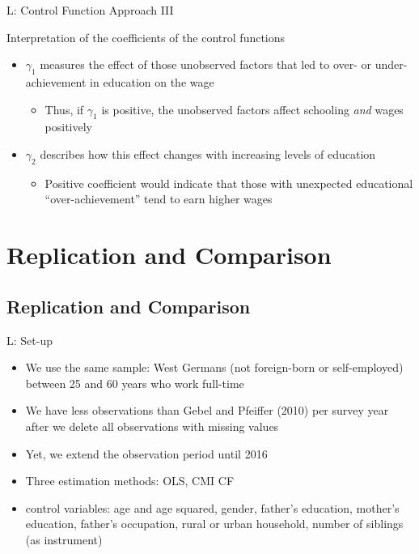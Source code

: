 \documentclass[10pt,ignorenonframetext,]{beamer}
\providecommand{\tightlist}{%
  \setlength{\itemsep}{0pt}\setlength{\parskip}{0pt}}
\begin{document}
\begin{frame}{L: Control Function Approach III}
\protect\hypertarget{l-control-function-approach-iii}{}

Interpretation of the coefficients of the control functions

\begin{itemize}
\tightlist
\item
  \(\gamma_1\) measures the effect of those unobserved factors that led
  to over- or under-achievement in education on the wage

  \begin{itemize}
  \tightlist
  \item
    Thus, if \(\gamma_1\) is positive, the unobserved factors affect
    schooling \emph{and} wages positively
  \end{itemize}
\item
  \(\gamma_2\) describes how this effect changes with increasing levels
  of education

  \begin{itemize}
  \tightlist
  \item
    Positive coefficient would indicate that those with unexpected
    educational ``over-achievement'' tend to earn higher wages
  \end{itemize}
\end{itemize}

\end{frame}

\hypertarget{replication-and-comparison}{%
\section{Replication and Comparison}\label{replication-and-comparison}}

\hypertarget{replication-and-comparison-1}{%
\subsection{Replication and
Comparison}\label{replication-and-comparison-1}}

\begin{frame}{L: Set-up}
\protect\hypertarget{l-set-up}{}

\begin{itemize}
\tightlist
\item
  We use the same sample: West Germans (not foreign-born or
  self-employed) between 25 and 60 years who work full-time
\item
  We have less observations than Gebel and Pfeiffer (2010) per survey
  year after we delete all observations with missing values
\item
  Yet, we extend the observation period until 2016
\item
  Three estimation methods: OLS, CMI CF
\item
  control variables: age and age squared, gender, father's education,
  mother's education, father's occupation, rural or urban household,
  number of siblings (as instrument)
\end{itemize}

\end{frame}
\end{document}

